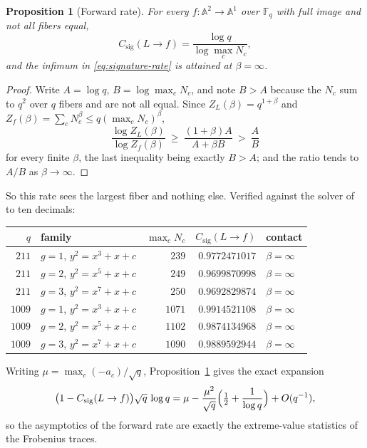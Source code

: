 \documentclass[11pt]{article}
\theoremstyle{definition}
\theoremstyle{plain}
\newtheorem{proposition}[definition]{Proposition}
\theoremstyle{remark}
\newcommand{\F}{\mathbb F}
\newcommand{\csig}{C_{\mathrm{sig}}}
\begin{document}
\begin{proposition}[Forward rate]
\label{prop:forward}
For every \(f:\mathbb A^2\to\mathbb A^1\) over \(\F_q\) with full image and not
all fibers equal,
\[
  \csig(L\to f)=\frac{\log q}{\log \max_c N_c},
\]
and the infimum in \eqref{eq:signature-rate} is attained at \(\beta=\infty\).
\end{proposition}

\begin{proof}
Write \(A=\log q\), \(B=\log\max_c N_c\), and note \(B>A\) because the \(N_c\)
sum to \(q^2\) over \(q\) fibers and are not all equal.  Since
\(Z_L(\beta)=q^{1+\beta}\) and \(Z_f(\beta)=\sum_cN_c^\beta\le q(\max_cN_c)^\beta\),
\[
  \frac{\log Z_L(\beta)}{\log Z_f(\beta)}
  \ \ge\ \frac{(1+\beta)A}{A+\beta B}\ >\ \frac AB
\]
for every finite \(\beta\), the last inequality being exactly \(B>A\); and the
ratio tends to \(A/B\) as \(\beta\to\infty\).
\end{proof}

So this rate sees the largest fiber and nothing else.  Verified against the
solver of \cite{vorozhtsov-exchange} to ten decimals:

\begin{center}
\begin{tabular}{@{}rlrrl@{}}
\toprule
\(q\) & family & \(\max_cN_c\) & \(\csig(L\to f)\) & contact\\
\midrule
\(211\)  & \(g=1\), \(y^2=x^3+x+c\) & \(239\)  & \(0.9772471017\) & \(\beta=\infty\)\\
\(211\)  & \(g=2\), \(y^2=x^5+x+c\) & \(249\)  & \(0.9699870998\) & \(\beta=\infty\)\\
\(211\)  & \(g=3\), \(y^2=x^7+x+c\) & \(250\)  & \(0.9692829874\) & \(\beta=\infty\)\\
\(1009\) & \(g=1\), \(y^2=x^3+x+c\) & \(1071\) & \(0.9914521108\) & \(\beta=\infty\)\\
\(1009\) & \(g=2\), \(y^2=x^5+x+c\) & \(1102\) & \(0.9874134968\) & \(\beta=\infty\)\\
\(1009\) & \(g=3\), \(y^2=x^7+x+c\) & \(1090\) & \(0.9889592944\) & \(\beta=\infty\)\\
\bottomrule
\end{tabular}
\end{center}

Writing \(\mu=\max_c(-a_c)/\sqrt q\), Proposition~\ref{prop:forward} gives the
exact expansion
\begin{equation}
  \bigl(1-\csig(L\to f)\bigr)\sqrt q\,\log q
  =\mu-\frac{\mu^2}{\sqrt q}\Bigl(\tfrac12+\frac1{\log q}\Bigr)+O(q^{-1}),
  \label{eq:mu-expansion}
\end{equation}
so the asymptotics of the forward rate are exactly the extreme-value
statistics of the Frobenius traces.
\end{document}
